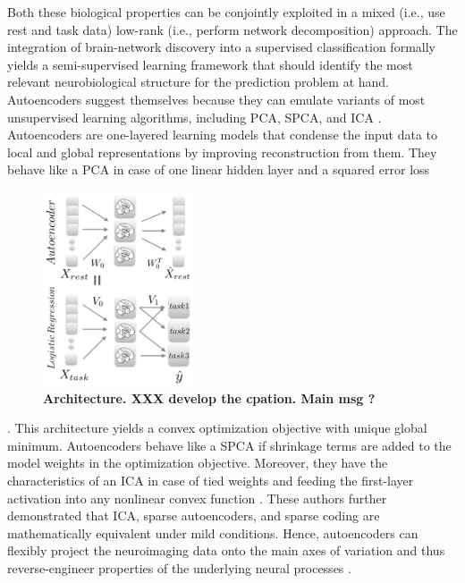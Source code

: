 \documentclass{article} %
\begin{document}
Both these biological properties can be conjointly exploited in a mixed
 (i.e., use rest and task data)
low-rank (i.e., perform network decomposition)
approach.
%
The integration of brain-network discovery into a 
supervised classification formally yields a semi-supervised learning framework that should identify the most relevant
neurobiological structure for the prediction problem at hand.
%
Autoencoders suggest themselves because they can emulate
variants of most unsupervised learning algorithms,
including PCA, SPCA, and ICA \cite{hinton06}.
Autoencoders
are one-layered learning models that condense the input data to
local and global representations
by improving reconstruction from them.
%
They behave like a PCA
in case of one linear hidden layer and a squared error loss
%
\begin{figure}
  \centering
    \includegraphics[width=0.40\textwidth]{figures/figure1.png}
  \caption {\textbf{Architecture. XXX develop the cpation. Main msg ?}
  }
\end{figure}
%
\cite{baldi1989neural}.
This architecture yields a convex optimization objective
with unique global minimum.
Autoencoders behave like a SPCA if shrinkage terms are added to the
model weights in the optimization objective.
Moreover, they have the characteristics of an ICA in case of tied weights
and feeding the first-layer activation into any nonlinear convex
function \cite{le2011ica}.
These authors further demonstrated that ICA, sparse autoencoders, and 
sparse coding are mathematically equivalent
under mild conditions.
%
Hence, autoencoders can flexibly project the neuroimaging data
onto the main axes of variation and thus
reverse-engineer properties of the underlying
neural processes \cite{olshausen96}.
\end{document}
